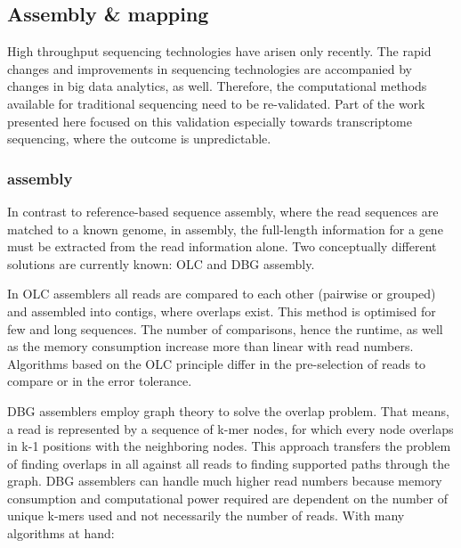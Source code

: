 \subsection{Assembly \& mapping}
High throughput sequencing technologies have arisen only recently.
The rapid changes and improvements in sequencing technologies are accompanied by changes in big data analytics, as well.
Therefore, the computational methods available for traditional sequencing need to be re-validated.
Part of the work presented here focused on this validation especially towards  transcriptome sequencing, where the outcome is unpredictable.
\subsubsection{ assembly}
In contrast to reference-based sequence assembly, where the read sequences are matched to a known genome, in  assembly, the full-length information for a gene must be extracted from the read information alone.
Two conceptually different solutions are currently known: \ac{OLC} and \ac{DBG} assembly.

In \ac{OLC} assemblers all reads are compared to each other (pairwise or grouped) and assembled into contigs, where overlaps exist.
This method is optimised for few and long sequences.
The number of comparisons, hence the runtime, as well as the memory consumption increase more than linear with read numbers.
Algorithms based on the \ac{OLC} principle differ in the pre-selection of reads to compare or in the error tolerance.

\ac{DBG} assemblers employ graph theory to solve the overlap problem.
That means, a read is represented by a sequence of k-mer nodes, for which every node overlaps in k-1 positions with the neighboring nodes.
This approach transfers the problem of finding overlaps in all against all reads to finding supported paths through the graph.
\ac{DBG} assemblers can handle much higher read numbers because memory consumption and computational power required are dependent on the number of unique k-mers used and not necessarily the number of reads.
With many algorithms at hand:

